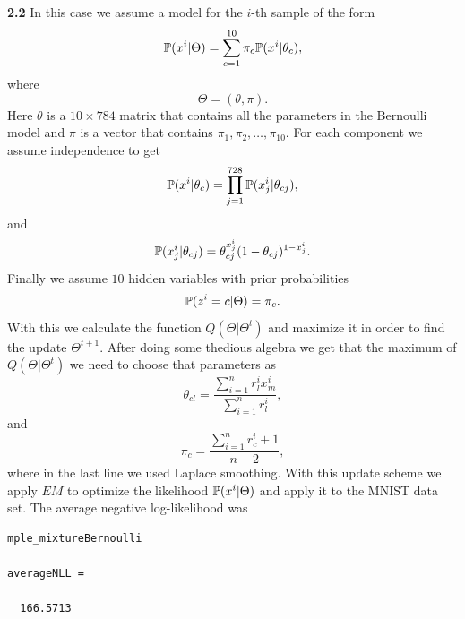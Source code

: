\documentclass{article}
\begin{document}
\textbf{2.2}
\newline
In this case we assume a model for the $i$-th sample of the form
\begin{equation*}
\mathbb{P}(x^{i}|\Theta)=\sum_{c=1}^{10}\pi_{c}\mathbb{P}(x^{i}|\theta_{c}),
\end{equation*}
where 
\begin{equation*}
\Theta=(\theta,\pi).	
\end{equation*}
Here $\theta$ is a $10\times 784$ matrix that contains all the parameters in the Bernoulli model and $\pi$ is 
a vector that contains $\pi_{1},\pi_{2},\ldots,\pi_{10}$.
For each component we assume independence to get 
\begin{equation*}
\mathbb{P}(x^{i}|\theta_{c})=\prod_{j=1}^{728}\mathbb{P}(x^{i}_{j}|\theta_{cj}),
\end{equation*}
and
\begin{equation*}
\mathbb{P}(x^{i}_{j}|\theta_{cj})=\theta_{cj}^{x^{i}_{j}}(1-\theta_{cj})^{1-x^{i}_{j}}.
\end{equation*}
Finally we assume $10$ hidden variables with prior probabilities 
\begin{equation*}
\mathbb{P}(z^{i}=c|\Theta)=\pi_{c}.
\end{equation*}
With this we calculate the function $Q(\Theta|\Theta^{t})$ and maximize it in order to find the update $\Theta^{t+1}$. After doing
some thedious algebra we get that the maximum of $Q(\Theta|\Theta^{t})$ we need to choose that parameters as
\begin{equation*}
\theta_{cl}=\frac{\sum_{i=1}^{n}r^{i}_{l}x^{i}_{m}}{\sum_{i=1}^{n} r^{i}_{l}},
\end{equation*}
and
\begin{equation*}
\pi_{c}=\frac{\sum_{i=1}^{n}r^{i}_{c}+1}{n+2},
\end{equation*}
where in the last line we used Laplace smoothing. With this update scheme we apply $EM$ to optimize the likelihood $\mathbb{P}(x^{i}|\Theta)$ and apply it to the MNIST data set.
The average negative log-likelihood was
\begin{verbatim}
mple_mixtureBernoulli

averageNLL =

  166.5713
\end{verbatim}
\end{document}

